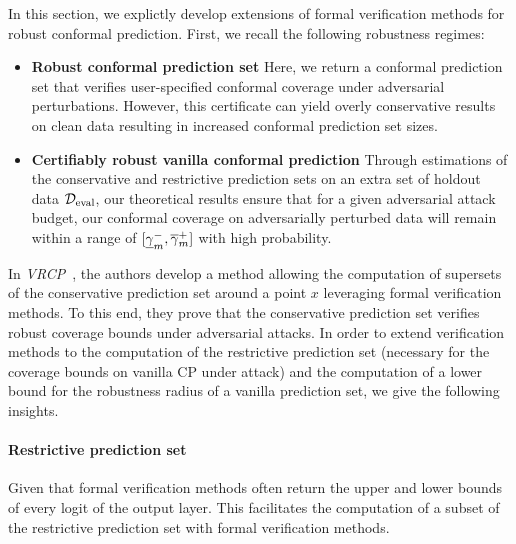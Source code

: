 \label{app:vanillapredsetcertificates}

In this section, we explictly develop extensions of formal verification methods for robust conformal prediction. First, we recall the following robustness regimes: 

\begin{itemize}
    \item \textbf{Robust conformal prediction set} Here, we return a conformal prediction set that verifies user-specified conformal coverage under adversarial perturbations. However, this certificate can yield overly conservative results on clean data resulting in increased conformal prediction set sizes.
    \item \textbf{Certifiably robust vanilla conformal prediction} Through estimations of the conservative and restrictive prediction sets on an extra set of holdout data $\mathcal{D}_\mathrm{eval}$, our theoretical results ensure that for a given adversarial attack budget, our conformal coverage on adversarially perturbed data will remain within a range of $[\underline{\gamma}_{m}^{-}, \overline{\gamma}_{m}^{+}]$ with high probability.
\end{itemize}

In \emph{VRCP}~\cite{vrcp}, the authors develop a method allowing the computation of supersets of the conservative prediction set around a point $x$ leveraging formal verification methods. To this end, they prove that the conservative prediction set verifies robust coverage bounds under adversarial attacks. In order to extend verification methods to the computation of the restrictive prediction set (necessary for the coverage bounds on vanilla CP under attack) and the computation of a lower bound for the robustness radius of a vanilla prediction set, we give the following insights. 

\paragraph{Restrictive prediction set} Given that formal verification methods often return the upper and lower bounds of every logit of the output layer. This facilitates the computation of a subset of the restrictive prediction set with formal verification methods. 
